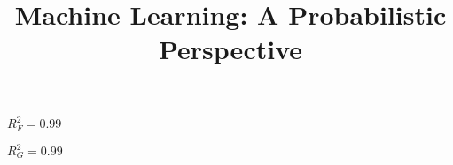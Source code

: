 \documentclass[a4paper,11pt]{article}
\begin{document}
\newcommand{\quotes}[1]{``#1''}
\newcommand{\E}{\mathop{\mathbb E}}

\title{Machine Learning: A Probabilistic Perspective}

\maketitle

$R^2_{F}=0.99$

\vspace{2mm}

$R^2_{G}=0.99$
\end{document}
